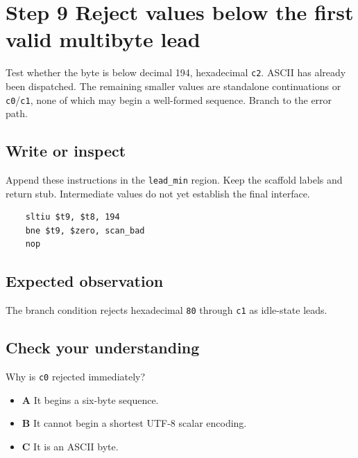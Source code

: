 \section{Step 9 Reject values below the first valid multibyte lead}\label{utf8-s09}

Test whether the byte is below decimal 194, hexadecimal \texttt{c2}. ASCII has already been dispatched. The remaining smaller values are standalone continuations or \texttt{c0}/\texttt{c1}, none of which may begin a well-formed sequence. Branch to the error path.

\subsection{Write or inspect}
Append these instructions in the \texttt{lead\_min} region. Keep the scaffold labels and return stub. Intermediate values do not yet establish the final interface.

\begin{verbatim}
    sltiu $t9, $t8, 194
    bne $t9, $zero, scan_bad
    nop
\end{verbatim}

\subsection{Expected observation}
The branch condition rejects hexadecimal \texttt{80} through \texttt{c1} as idle-state leads.

\subsection{Check your understanding}
Why is \texttt{c0} rejected immediately?

\begin{itemize}
  \item \textbf{A} It begins a six-byte sequence.
  \item \textbf{B} It cannot begin a shortest UTF-8 scalar encoding.
  \item \textbf{C} It is an ASCII byte.
\end{itemize}
